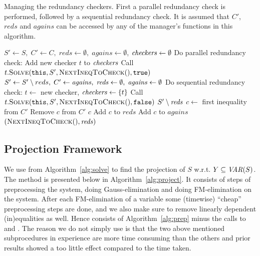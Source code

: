 \begin{algorithm}[htbp]
\begin{algorithmic}[1]\caption{Managing the redundancy checkers. First a parallel redundancy check is performed, followed by a sequential redundancy check. It is assumed that $C'$, $\mathit{reds}$ and $\mathit{agains}$ can be accessed by any of the manager's functions in this algorithm.}\label{alg:manager}
	\State $S'\gets S,\; C'\gets C,\; \mathit{reds} \gets \emptyset,\; \mathit{agains} \gets \emptyset$, $\mathit{checkers} \gets \emptyset$ 		
\State Do parallel redundancy check:
\Indent
		\State Add new checker $t$ to $\mathit{checkers}$
		\State Call $t.\Call{Solve}{\texttt{this}, S', \textsc{NextIneqToCheck}(), \true}$ 
\EndIndent
\State
\State $S'\gets S'\setminus reds,\; C'\gets \mathit{agains},\; \mathit{reds} \gets \emptyset,\; \mathit{agains} \gets \emptyset$
\State Do sequential redundancy check:
\Indent
		\State $t\gets $ new checker, $\mathit{checkers} \gets \{t\}$ 		
		\State Call $t.\Call{Solve}{\texttt{this}, S', \textsc{NextIneqToCheck}(), \false}$		
	\EndIf
\EndIndent
\State \Return $S'\setminus \mathit{reds}$ 
\EndFunction
\State
{}
			\State\Return \nul
		\Else
			\State $c \gets$ first inequality from $C'$
			\State Remove $c$ from $C'$
			\State \Return $c$
		\EndIf
\EndFunction
\State
{}\label{line:manageResult}
		\State Add $c$ to $\mathit{reds}$
			\State Add $c$ to $\mathit{agains}$ 
	\EndIf
	\State \Return $(\Call{NextIneqToCheck}{\null}, \mi{reds})$
\EndFunction
\State
\end{algorithmic}		
\end{algorithm}
%
\subsection{Projection Framework}
We use  from Algorithm~\ref{alg:solve} to find the projection of $S$ w.r.t. $Y\subseteq \mathit{VAR}(S)$. The method  is presented below in Algorithm~\ref{alg:project}. It consists of steps of preprocessing the system, doing Gauss-elimination and doing FM-elimination on the system. After each FM-elimination of a variable some (timewise) ``cheap'' preprocessing steps are done, and we also make sure to remove linearly dependent (in)equalities as well. 
Hence  consists of %
Algorithm~\ref{alg:prep} minus the calls to  and .
The reason we do not simply use  is that the two above mentioned subprocedures in experience 
are more time consuming than the others and prior results showed a too little effect compared to the time taken.

